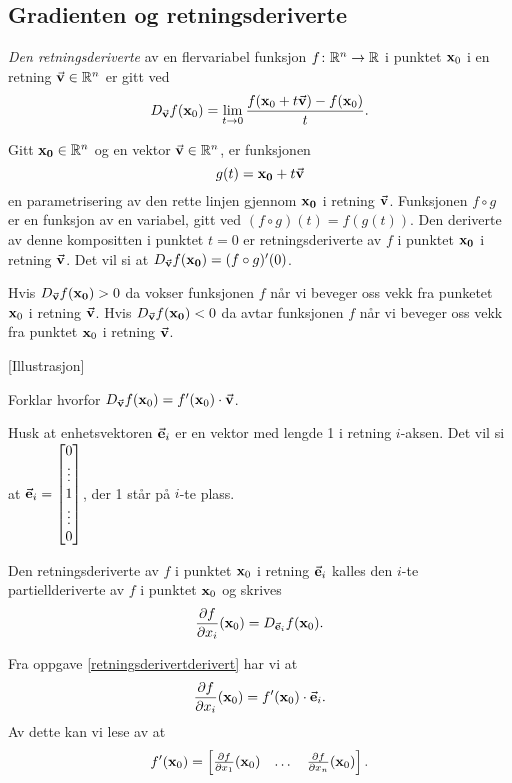 \subsection{Gradienten og retningsderiverte}
\begin{definisjon}
  {\em Den retningsderiverte} av en flervariabel funksjon $f \colon \mathbb{R}^n \to
  \mathbb{R}$ i punktet $\mathbf{x}_0$ i en retning $\vec{\mathbf{v}} \in \mathbb{R}^n$ er gitt ved
  $$D_{\vec{\mathbf{v}}} f(\mathbf{x}_0) = \lim_{t\to 0} \frac{f(\mathbf{x}_0 + t\vec{\mathbf{v}}) - f(\mathbf{x}_0)}{t}.$$
\end{definisjon}
Gitt $\mathbf{x_0} \in \mathbb{R}^n$ og en vektor $\vec{\mathbf{v}} \in \mathbb{R}^n$, er funksjonen 
$$g(t) = \mathbf{x_0} + t\vec{\mathbf{v}}$$
en parametrisering av den rette linjen gjennom $\mathbf{x_0}$ i retning $\vec{\mathbf{v}}$.
Funksjonen $f \circ g$ er en funksjon av en variabel, gitt ved $(f \circ g)(t) = f(g(t))$.
Den deriverte av denne kompositten
i punktet $t=0$ er retningsderiverte av $f$ i punktet $\mathbf{x_0}$ i retning
$\vec{\mathbf{v}}$. Det vil si at
$D_{\vec{\mathbf{v}}} f(\mathbf{x_0}) = (f \circ g)'(0)$.

Hvis $D_{\vec{\mathbf{v}}} f(\mathbf{x_0}) > 0$ da vokser funksjonen $f$ når vi beveger oss
vekk fra punketet $\mathbf{x}_0$ i retning $\vec{\mathbf{v}}$. Hvis $D_{\vec{\mathbf{v}}} f(\mathbf{x_0}) < 0$ da
avtar funksjonen $f$ når vi beveger oss vekk fra punktet $\mathbf{x}_0$ i retning $\vec{\mathbf{v}}$.

[Illustrasjon]

\begin{oppgave}\label{retningsderivertderivert}
  Forklar hvorfor $D_{\vec{\mathbf{v}}} f(\mathbf{x}_0) = f'(\mathbf{x}_0)\cdot \vec{\mathbf{v}}$.
\end{oppgave}
  Husk at enhetsvektoren $\vec{\mathbf{e}}_i$ er en vektor med lengde 1 i retning $i$-aksen. Det vil
  si at $\vec{\mathbf{e}}_i = \begin{bmatrix} 0 \\ \vdots \\ 1 \\ \vdots \\ 0 \end{bmatrix}$, der 1
  står på $i$-te plass.
\begin{definisjon}
  Den retningsderiverte av $f$ i punktet $\mathbf{x}_0$ i retning $\vec{\mathbf{e}}_i$
  kalles den $i$-te partiellderiverte av $f$ i punktet $\mathbf{x}_0$ og skrives
  $$\frac{\partial f}{\partial x_i}(\mathbf{x}_0) = D_{\vec{\mathbf{e}}_i} f(\mathbf{x}_0).$$
\end{definisjon}
Fra oppgave \ref{retningsderivertderivert} har vi at
$$\frac{\partial f}{\partial x_i}(\mathbf{x}_0) = f'(\mathbf{x}_0)\cdot \vec{\mathbf{e}}_i.$$
Av dette kan vi lese av at
$$f'(\mathbf{x}_0) = \begin{bmatrix} \frac{\partial f}{\partial x_1}(\mathbf{x}_0) & \dots & \frac{\partial f}{\partial x_n}(\mathbf{x}_0) \end{bmatrix}.$$


